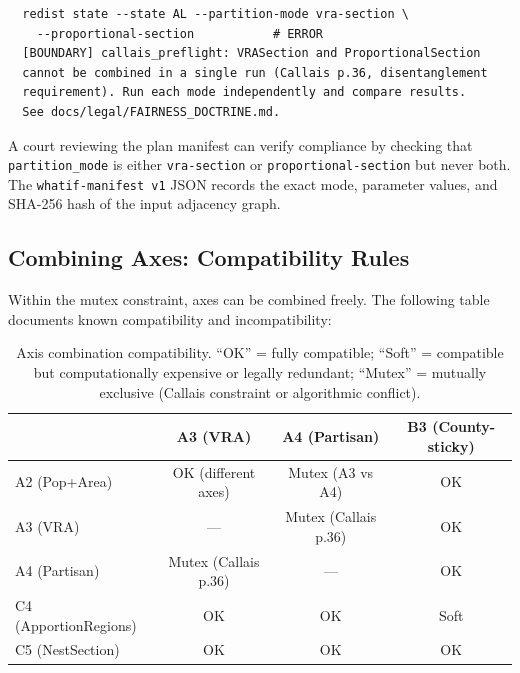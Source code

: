 \begin{verbatim}
  redist state --state AL --partition-mode vra-section \
    --proportional-section           # ERROR
  [BOUNDARY] callais_preflight: VRASection and ProportionalSection
  cannot be combined in a single run (Callais p.36, disentanglement
  requirement). Run each mode independently and compare results.
  See docs/legal/FAIRNESS_DOCTRINE.md.
\end{verbatim}

A court reviewing the plan manifest can verify compliance by checking that
\texttt{partition\_mode} is either \texttt{vra-section} or
\texttt{proportional-section} but never both.
The \texttt{whatif-manifest v1} JSON records the exact mode, parameter values,
and SHA-256 hash of the input adjacency graph.

\subsection{Combining Axes: Compatibility Rules}

Within the mutex constraint, axes can be combined freely.
The following table documents known compatibility and incompatibility:

\begin{table}[h]
\centering
\small
\caption{Axis combination compatibility. ``OK'' = fully compatible; ``Soft'' =
  compatible but computationally expensive or legally redundant;
  ``Mutex'' = mutually exclusive (Callais constraint or algorithmic conflict).}
\label{tab:compatibility}
\begin{tabular}{l ccc}
\toprule
 & A3 (VRA) & A4 (Partisan) & B3 (County-sticky) \\
\midrule
A2 (Pop+Area) & OK (different axes) & Mutex (A3 vs A4) & OK \\
A3 (VRA) & --- & Mutex (Callais p.36) & OK \\
A4 (Partisan) & Mutex (Callais p.36) & --- & OK \\
C4 (ApportionRegions) & OK & OK & Soft \\
C5 (NestSection) & OK & OK & OK \\
\bottomrule
\end{tabular}
\end{table}
